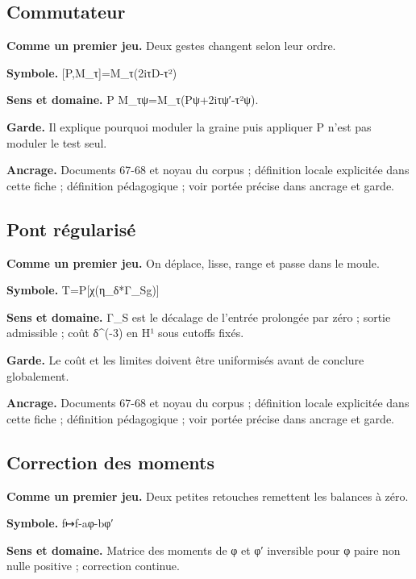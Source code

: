 \documentclass[
  9pt,
  a4paper,
]{article}
\begin{document}
\hypertarget{commutateur}{%
\subsection{Commutateur}\label{commutateur}}

\textbf{Comme un premier jeu.} Deux gestes changent selon leur ordre.

\textbf{Symbole.} {[}P,M\_τ{]}=M\_τ(2iτD-τ²)

\textbf{Sens et domaine.} P M\_τψ=M\_τ(Pψ+2iτψ′-τ²ψ).

\textbf{Garde.} Il explique pourquoi moduler la graine puis appliquer P
n'est pas moduler le test seul.

\textbf{Ancrage.} Documents 67-68 et noyau du corpus ; définition locale
explicitée dans cette fiche ; définition pédagogique ; voir portée
précise dans ancrage et garde.

\hypertarget{pont-ruxe9gularisuxe9}{%
\subsection{Pont régularisé}\label{pont-ruxe9gularisuxe9}}

\textbf{Comme un premier jeu.} On déplace, lisse, range et passe dans le
moule.

\textbf{Symbole.} T=P{[}χ(η\_δ*Γ\_Sg){]}

\textbf{Sens et domaine.} Γ\_S est le décalage de l'entrée prolongée par
zéro ; sortie admissible ; coût δ\^{}(-3) en H¹ sous cutoffs fixés.

\textbf{Garde.} Le coût et les limites doivent être uniformisés avant de
conclure globalement.

\textbf{Ancrage.} Documents 67-68 et noyau du corpus ; définition locale
explicitée dans cette fiche ; définition pédagogique ; voir portée
précise dans ancrage et garde.

\hypertarget{correction-des-moments}{%
\subsection{Correction des moments}\label{correction-des-moments}}

\textbf{Comme un premier jeu.} Deux petites retouches remettent les
balances à zéro.

\textbf{Symbole.} f↦f-aφ-bφ′

\textbf{Sens et domaine.} Matrice des moments de φ et φ′ inversible pour
φ paire non nulle positive ; correction continue.
\end{document}
